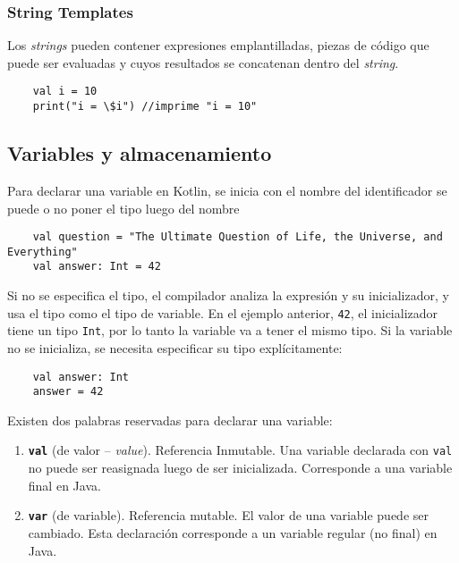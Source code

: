\subsubsection{String Templates}
Los \emph{strings} pueden contener expresiones emplantilladas, piezas de código que puede ser evaluadas y cuyos resultados se concatenan dentro del \emph{string}. 
\begin{verbatim}
    val i = 10
    print("i = \$i") //imprime "i = 10"
\end{verbatim}




\subsection{Variables y almacenamiento} \label{sec:variables-almacenamiento}
Para declarar una variable en Kotlin, se inicia con el nombre del identificador se puede o no poner el tipo luego del nombre
\begin{verbatim}
    val question = "The Ultimate Question of Life, the Universe, and Everything"
    val answer: Int = 42
\end{verbatim}
Si no se especifica el tipo, el compilador analiza la expresión y su inicializador, y usa el tipo como el tipo de variable\cite{kotlin-in-action}. En el ejemplo anterior, \texttt{42}, el inicializador tiene un tipo \texttt{Int}, por lo tanto la variable va a tener el mismo tipo. Si la variable no se inicializa, se necesita especificar su tipo explícitamente:
\begin{verbatim}
    val answer: Int
    answer = 42
\end{verbatim}

Existen dos palabras reservadas para declarar una variable:
\begin{enumerate}
    \item \textbf{\texttt{val}} (de valor -- \emph{value}). Referencia Inmutable. Una variable declarada con \texttt{val} no puede ser reasignada luego de ser inicializada. Corresponde a una variable final en Java.
    \item \textbf{\texttt{var}} (de variable). Referencia mutable. El valor de una variable puede ser cambiado. Esta declaración corresponde a un variable regular (no final) en Java.
\end{enumerate}

